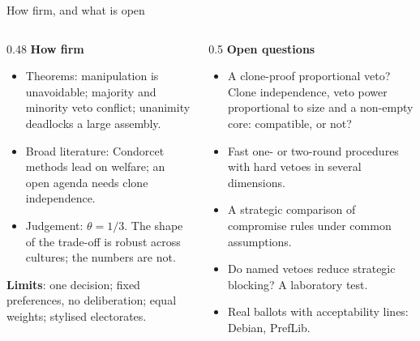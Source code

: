 \documentclass[10pt,aspectratio=169]{beamer}
\begin{document}
\begin{frame}{How firm, and what is open}
  \begin{columns}[T]
    \begin{column}{0.48\textwidth}
      \textbf{How firm}
      \begin{itemize}\small
        \item Theorems: manipulation is unavoidable; majority and minority veto conflict; unanimity deadlocks
          a large assembly.
        \item Broad literature: Condorcet methods lead on welfare; an open agenda needs clone independence.
        \item Judgement: $\theta = 1/3$. The shape of the trade-off is robust across cultures; the numbers are
          not.
      \end{itemize}
      \textbf{Limits}: one decision; fixed preferences, no deliberation; equal weights; stylised electorates.
    \end{column}
    \begin{column}{0.5\textwidth}
      \textbf{Open questions}
      \begin{itemize}\small
        \item \alert{A clone-proof proportional veto?} Clone independence, veto power proportional to size and
          a non-empty core: compatible, or not?
        \item Fast one- or two-round procedures with hard vetoes in several dimensions.
        \item A strategic comparison of compromise rules under common assumptions.
        \item Do named vetoes reduce strategic blocking? A laboratory test.
        \item Real ballots with acceptability lines: Debian, PrefLib.
      \end{itemize}
    \end{column}
  \end{columns}
\end{frame}
\end{document}
